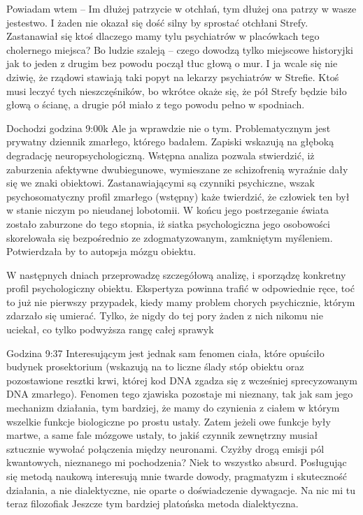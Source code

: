 \documentclass[../MAIN.tex]{subfiles}
\begin{document}
Powiadam wtem – Im dłużej patrzycie w otchłań, tym dłużej ona
patrzy w wasze jestestwo. I żaden nie okazał się dość silny by
sprostać otchłani Strefy. Zastanawiał się ktoś dlaczego mamy
tylu psychiatrów w placówkach tego cholernego miejsca? Bo
ludzie szaleją – czego dowodzą tylko miejscowe historyjki jak
to jeden z drugim bez powodu począł tłuc głową o mur. I ja
wcale się nie dziwię, że rządowi stawiają taki popyt na lekarzy
psychiatrów w Strefie. Ktoś musi leczyć tych nieszczęśników, bo
wkrótce okaże się, że pół Strefy będzie biło głową o ścianę, a
drugie pół miało z tego powodu pełno w spodniach.

Dochodzi godzina 9:00\3k
Ale ja wprawdzie nie o tym. Problematycznym jest prywatny
dziennik zmarłego, którego badałem. Zapiski wskazują na głęboką
degradację neuropsychologiczną. Wstępna analiza pozwala
stwierdzić, iż zaburzenia afektywne dwubiegunowe, wymieszane ze
schizofrenią wyraźnie dały się we znaki obiektowi.
Zastanawiającymi są czynniki psychiczne, wszak psychosomatyczny
profil zmarłego (wstępny) każe twierdzić, że człowiek ten był w
stanie niczym po nieudanej lobotomii. W końcu jego postrzeganie
świata zostało zaburzone do tego stopnia, iż siatka
psychologiczna jego osobowości skorelowała się bezpośrednio ze
zdogmatyzowanym, zamkniętym myśleniem. Potwierdzała by to
autopsja mózgu obiektu.

W następnych dniach przeprowadzę szczegółową analizę, i
sporządzę konkretny profil psychologiczny obiektu. Ekspertyza
powinna trafić w odpowiednie ręce, toć to już nie pierwszy
przypadek, kiedy mamy problem chorych psychicznie, którym
zdarzało się umierać. Tylko, że nigdy do tej pory żaden z nich
nikomu nie uciekał, co tylko podwyższa rangę całej sprawy\3k

Godzina 9:37
Interesującym jest jednak sam fenomen ciała, które opuściło
budynek prosektorium (wskazują na to liczne ślady stóp obiektu
oraz pozostawione resztki krwi, której kod DNA zgadza się z
wcześniej sprecyzowanym DNA zmarłego). Fenomen tego zjawiska
pozostaje mi nieznany, tak jak sam jego mechanizm działania,
tym bardziej, że mamy do czynienia z ciałem w którym wszelkie
funkcje biologiczne po prostu ustały. Zatem jeżeli owe funkcje
były martwe, a same fale mózgowe ustały, to jakiś czynnik
zewnętrzny musiał sztucznie wywołać połączenia między
neuronami. Czyżby drogą emisji pól kwantowych, nieznanego mi
pochodzenia? Nie\3k to wszystko absurd. Posługując się metodą
naukową interesują mnie twarde dowody, pragmatyzm i skuteczność
działania, a nie dialektyczne, nie oparte o doświadczenie
dywagacje. Na nic mi tu teraz filozofia\3k Jeszcze tym bardziej
platońska metoda dialektyczna.
\end{document}
